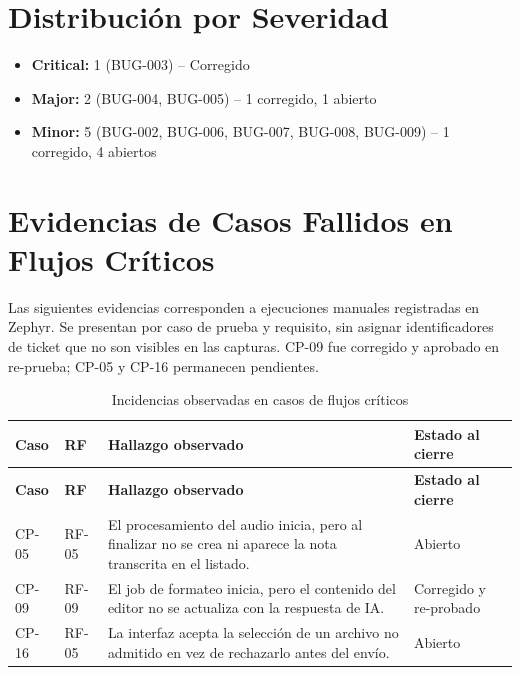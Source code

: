 \section{Distribución por Severidad}

\begin{itemize}
    \item \textbf{Critical:} 1 (BUG-003) -- Corregido
    \item \textbf{Major:} 2 (BUG-004, BUG-005) -- 1 corregido, 1 abierto
    \item \textbf{Minor:} 5 (BUG-002, BUG-006, BUG-007, BUG-008, BUG-009) -- 1 corregido, 4 abiertos
\end{itemize}

\section{Evidencias de Casos Fallidos en Flujos Críticos}

Las siguientes evidencias corresponden a ejecuciones manuales registradas en Zephyr. Se presentan por caso de prueba y requisito, sin asignar identificadores de ticket que no son visibles en las capturas. CP-09 fue corregido y aprobado en re-prueba; CP-05 y CP-16 permanecen pendientes.

\begin{longtable}{p{1.5cm}p{1.5cm}p{7.2cm}>{\RaggedRight\arraybackslash}p{3.4cm}}
\caption{Incidencias observadas en casos de flujos críticos}
\label{tab:evidencias-fallos-criticos}\\
\toprule
\textbf{Caso} & \textbf{RF} & \textbf{Hallazgo observado} & \textbf{Estado al cierre}\\
\midrule
\endfirsthead
\toprule
\textbf{Caso} & \textbf{RF} & \textbf{Hallazgo observado} & \textbf{Estado al cierre}\\
\midrule
\endhead
\bottomrule
\endfoot
CP-05 & RF-05 & El procesamiento del audio inicia, pero al finalizar no se crea ni aparece la nota transcrita en el listado. & \textcolor{FalloColor}{Abierto}\\
CP-09 & RF-09 & El job de formateo inicia, pero el contenido del editor no se actualiza con la respuesta de IA. & \textcolor{PasoColor}{Corregido y re-probado}\\
CP-16 & RF-05 & La interfaz acepta la selección de un archivo no admitido en vez de rechazarlo antes del envío. & \textcolor{FalloColor}{Abierto}\\
\bottomrule
\end{longtable}

